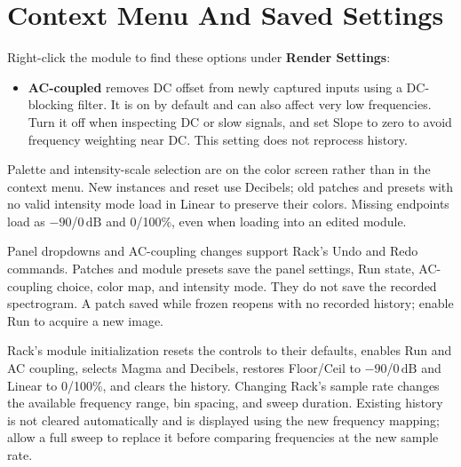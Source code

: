 \section{Context Menu And Saved Settings}\label{sec:settings}

Right-click the module to find these options under \textbf{Render Settings}:
\begin{itemize}
  \item \textbf{AC-coupled} removes DC offset from newly captured inputs
  using a DC-blocking filter. It is on by default and can also affect very
  low frequencies. Turn it off when inspecting DC or slow signals, and set
  Slope to zero to avoid frequency weighting near DC. This setting does not
  reprocess history.
\end{itemize}

Palette and intensity-scale selection are on the color screen rather than
in the context menu. New instances and reset use Decibels; old patches and
presets with no valid intensity mode load in Linear to preserve their
colors. Missing endpoints load as $-90$/$0\,\mathrm{dB}$ and 0/100\%, even
when loading into an edited module.

Panel dropdowns and AC-coupling changes support Rack's Undo and Redo commands. Patches and module
presets save the panel settings, Run state, AC-coupling choice, color map,
and intensity mode.
They do not save the recorded spectrogram. A patch saved while frozen reopens
with no recorded history; enable Run to acquire a new image.

Rack's module initialization resets the controls to their defaults, enables
Run and AC coupling, selects Magma and Decibels, restores Floor/Ceil to
$-90$/$0\,\mathrm{dB}$ and Linear to 0/100\%, and clears the history. Changing Rack's
sample rate changes the available frequency range, bin spacing, and sweep
duration. Existing history is not cleared automatically and is displayed
using the new frequency mapping; allow a full sweep to replace it before
comparing frequencies at the new sample rate.
